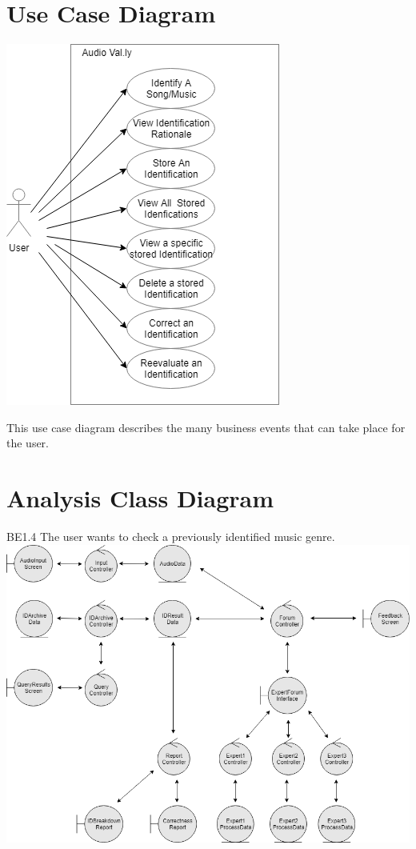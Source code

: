 \documentclass[]{article}
\begin{document}
\section{Use Case Diagram}
\label{sec:use_case_diagram}
\begin{center}
\includegraphics[scale=0.5]{uc}
\end{center}
This use case diagram describes the many business events that can take place for the user.

\newpage
\section{Analysis Class Diagram}
\label{sec:analysis_class_diagram}
\begin{center}
BE1.4 The user wants to check a previously identified music genre.
\includegraphics[scale=0.5]{analysisclass}
\end{center}
\end{document}
